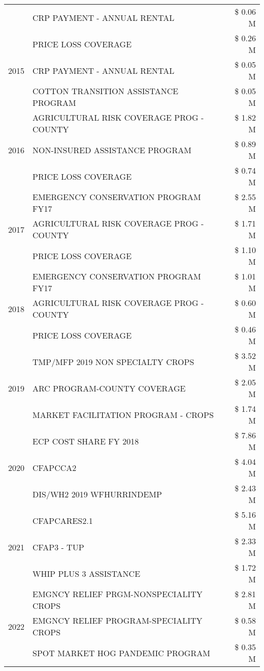 \begin{tabular}{llr}
 & CRP PAYMENT - ANNUAL RENTAL & \$ 0.06 M \\
\cline{1-3}
\multirow[t]{3}{*}{2015} & PRICE LOSS COVERAGE & \$ 0.26 M \\
 & CRP PAYMENT - ANNUAL RENTAL & \$ 0.05 M \\
 & COTTON TRANSITION ASSISTANCE PROGRAM & \$ 0.05 M \\
\cline{1-3}
\multirow[t]{3}{*}{2016} & AGRICULTURAL RISK COVERAGE PROG - COUNTY & \$ 1.82 M \\
 & NON-INSURED ASSISTANCE PROGRAM & \$ 0.89 M \\
 & PRICE LOSS COVERAGE & \$ 0.74 M \\
\cline{1-3}
\multirow[t]{3}{*}{2017} & EMERGENCY CONSERVATION PROGRAM FY17 & \$ 2.55 M \\
 & AGRICULTURAL RISK COVERAGE PROG - COUNTY & \$ 1.71 M \\
 & PRICE LOSS COVERAGE & \$ 1.10 M \\
\cline{1-3}
\multirow[t]{3}{*}{2018} & EMERGENCY CONSERVATION PROGRAM FY17 & \$ 1.01 M \\
 & AGRICULTURAL RISK COVERAGE PROG - COUNTY & \$ 0.60 M \\
 & PRICE LOSS COVERAGE & \$ 0.46 M \\
\cline{1-3}
\multirow[t]{3}{*}{2019} & TMP/MFP 2019 NON SPECIALTY CROPS & \$ 3.52 M \\
 & ARC PROGRAM-COUNTY COVERAGE & \$ 2.05 M \\
 & MARKET FACILITATION PROGRAM - CROPS & \$ 1.74 M \\
\cline{1-3}
\multirow[t]{3}{*}{2020} & ECP COST SHARE FY 2018 & \$ 7.86 M \\
 & CFAPCCA2 & \$ 4.04 M \\
 & DIS/WH2 2019 WFHURRINDEMP & \$ 2.43 M \\
\cline{1-3}
\multirow[t]{3}{*}{2021} & CFAPCARES2.1 & \$ 5.16 M \\
 & CFAP3 - TUP & \$ 2.33 M \\
 & WHIP PLUS 3 ASSISTANCE & \$ 1.72 M \\
\cline{1-3}
\multirow[t]{3}{*}{2022} & EMGNCY RELIEF PRGM-NONSPECIALITY CROPS & \$ 2.81 M \\
 & EMGNCY RELIEF PROGRAM-SPECIALITY CROPS & \$ 0.58 M \\
 & SPOT MARKET HOG PANDEMIC PROGRAM & \$ 0.35 M \\
\cline{1-3}
\bottomrule
\end{tabular}
